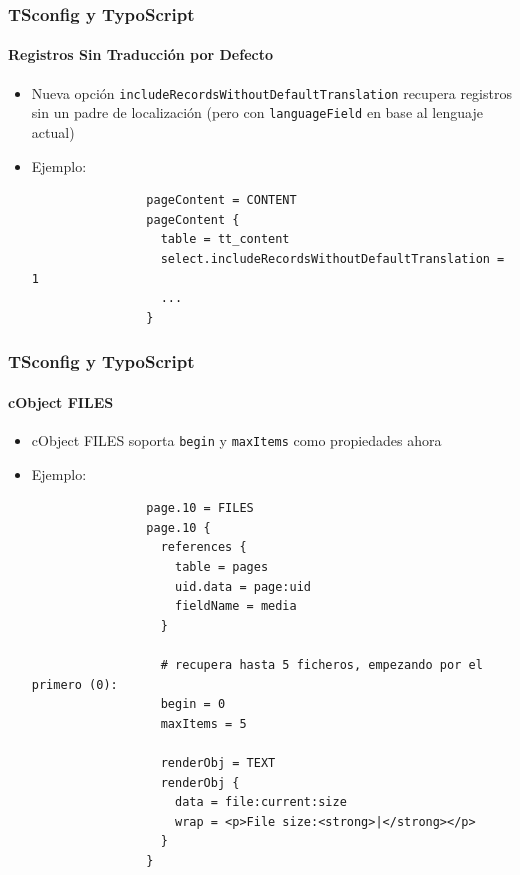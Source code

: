 
\begin{frame}[fragile]
	\frametitle{TSconfig y TypoScript}
	\framesubtitle{Registros Sin Traducción por Defecto}

	\begin{itemize}

		\item Nueva opción \texttt{includeRecordsWithoutDefaultTranslation}
			recupera registros sin un padre de localización\newline
			(pero con \texttt{languageField} en base al lenguaje actual)

		\item Ejemplo:

			\begin{lstlisting}
				pageContent = CONTENT
				pageContent {
				  table = tt_content
				  select.includeRecordsWithoutDefaultTranslation = 1
				  ...
				}
			\end{lstlisting}

	\end{itemize}

\end{frame}


\begin{frame}[fragile]
	\frametitle{TSconfig y TypoScript}
	\framesubtitle{cObject FILES}

	\begin{itemize}

		\item cObject FILES soporta \texttt{begin} y \texttt{maxItems} como propiedades ahora

		\item Ejemplo:

			\lstset{
				basicstyle=\tiny\ttfamily
			}

			\begin{lstlisting}
				page.10 = FILES
				page.10 {
				  references {
				    table = pages
				    uid.data = page:uid
				    fieldName = media
				  }

				  # recupera hasta 5 ficheros, empezando por el primero (0):
				  begin = 0
				  maxItems = 5

				  renderObj = TEXT
				  renderObj {
				    data = file:current:size
				    wrap = <p>File size:<strong>|</strong></p>
				  }
				}
			\end{lstlisting}

	\end{itemize}

\end{frame}

